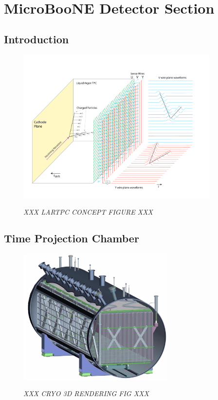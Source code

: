 
\section{MicroBooNE Detector Section}\label{UBDetectorSection}

\subsection{Introduction}


\begin{figure}[ht!]
\centering
	\includegraphics[width=0.9\textwidth]{Figures/LArTPC_concept.png} \\
\caption{\textit{ XXX LARTPC CONCEPT FIGURE XXX}}\label{LArTPC_concept_fig}
\end{figure}


\subsection{Time Projection Chamber}



\begin{figure}[ht!]
\centering
	\includegraphics[width=0.7\textwidth]{Figures/cryo_3D_rendering.png} \\
\caption{\textit{ XXX CRYO 3D RENDERING FIG XXX}}\label{cryo_3D_rendering_fig}
\end{figure}


